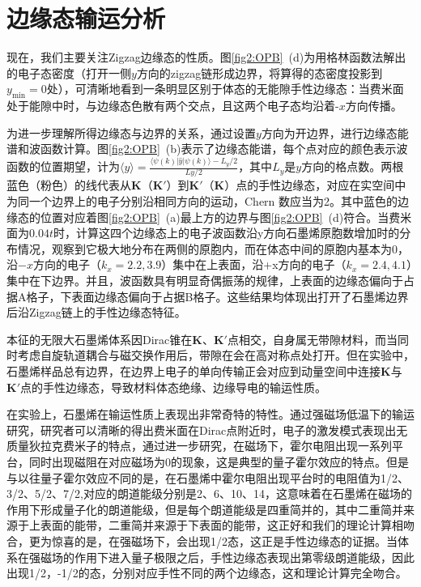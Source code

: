     \section{边缘态输运分析}\label{sec:result}
    现在，我们主要关注Zigzag边缘态的性质。图\ref{fig2:OPB}~(d)为用格林函数法解出的电子态密度（打开一侧$y$方向的zigzag链形成边界，将算得的态密度投影到$y_\text{min}=0$处），可清晰地看到一条明显区别于体态的无能隙手性边缘态：当费米面处于能隙中时，与边缘态色散有两个交点，且这两个电子态均沿着-$x$方向传播。

    为进一步理解所得边缘态与边界的关系，通过设置$y$方向为开边界，进行边缘态能谱和波函数计算。图\ref{fig2:OPB}~(b)表示了边缘态能谱，每个点对应的颜色表示波函数的位置期望，计为$\langle y\rangle=\frac{\langle \psi(k)\vert\hat{y} \vert \psi(k)\rangle-L_y/2}{Ly/2}$，其中$L_y$是$y$方向的格点数。两根蓝色（粉色）的线代表从$\mathbf{K}$（$\mathbf{K}'$）到$\mathbf{K}'$（$\mathbf{K}$）点的手性边缘态，对应在实空间中为同一个边界上的电子分别沿相同方向的运动，Chern
数应当为2。其中蓝色的边缘态的位置对应着图\ref{fig2:OPB}~(a)最上方的边界与图\ref{fig2:OPB}~(d)符合。当费米面为$0.04t$时，计算这四个边缘态上的电子波函数沿y方向石墨烯原胞数增加时的分布情况，观察到它极大地分布在两侧的原胞内，而在体态中间的原胞内基本为0，沿$-x$方向的电子（$k_x=2.2,3.9$）集中在上表面，沿+x方向的电子（$k_x=2.4,4.1$）集中在下边界。并且，波函数具有明显奇偶振荡的规律，上表面的边缘态偏向于占据A格子，下表面边缘态偏向于占据B格子。这些结果均体现出打开了石墨烯边界后沿Zigzag链上的手性边缘态特征。

    本征的无限大石墨烯体系因Dirac锥在$\mathbf{K}$、$\mathbf{K}'$点相交，自身属无带隙材料，而当同时考虑自旋轨道耦合与磁交换作用后，带隙在会在高对称点处打开。但在实验中，石墨烯样品总有边界，在边界上电子的单向传输正会对应到动量空间中连接$\mathbf{K}$与$\mathbf{K}'$点的手性边缘态，导致材料体态绝缘、边缘导电的输运性质。

    在实验上，石墨烯在输运性质上表现出非常奇特的特性。通过强磁场低温下的输运研究，研究者可以清晰的得出费米面在Dirac点附近时，电子的激发模式表现出无质量狄拉克费米子的特点，通过进一步研究，在磁场下，霍尔电阻出现一系列平台，同时出现磁阻在对应磁场为$0$的现象，这是典型的量子霍尔效应的特点。但是与以往量子霍尔效应不同的是，在石墨烯中霍尔电阻出现平台时的电阻值为1/2、3/2、5/2、7/2,对应的朗道能级分别是2、6、10、14，这意味着在石墨烯在磁场的作用下形成量子化的朗道能级，但是每个朗道能级是四重简并的，其中二重简并来源于上表面的能带，二重简并来源于下表面的能带，这正好和我们的理论计算相吻合，更为惊喜的是，在强磁场下，会出现1/2态，这正是手性边缘态的证据。当体系在强磁场的作用下进入量子极限之后，手性边缘态表现出第零级朗道能级，因此出现1/2，-1/2的态，分别对应手性不同的两个边缘态，这和理论计算完全吻合。


